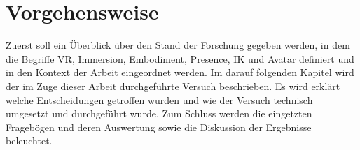 \section{Vorgehensweise}
Zuerst soll ein Überblick über den Stand der Forschung gegeben werden, in dem die Begriffe VR, Immersion, Embodiment, Presence, IK und Avatar definiert und in den Kontext der Arbeit eingeordnet werden. Im darauf folgenden Kapitel wird der im Zuge dieser Arbeit durchgeführte Versuch beschrieben. Es wird erklärt welche Entscheidungen getroffen wurden und wie der Versuch technisch umgesetzt und durchgeführt wurde. Zum Schluss werden die eingetzten Fragebögen und deren Auswertung sowie die Diskussion der Ergebnisse beleuchtet.